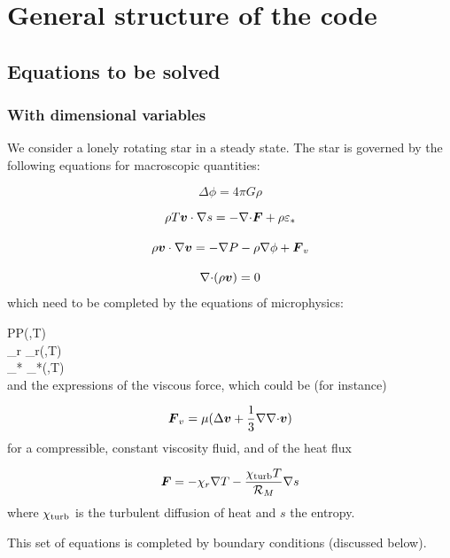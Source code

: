 \chapter{General structure of the code}


\section{Equations to be solved}

\subsection{With dimensional variables}

We consider a lonely rotating star in a steady state. The star is
governed by the following equations for macroscopic quantities:

\begin{equation} \Delta\phi = 4\pi G\rho\end{equation}

\begin{equation} \rho T \vv\cdot\nabla s = -\Div\vF + \rho\eps_*\end{equation}

\begin{equation} \rho \vv\cdot\na\vv = -\na P -\rho\na\phi+\vF_v\end{equation}

\begin{equation} \Div(\rho\vv) =0\end{equation}
which need to be completed by the equations of microphysics:

\greq
P\equiv P(\rho,T)\\
\khi_r \equiv \khi_r(\rho,T)\\
\eps_* \equiv \eps_*(\rho,T)\\
\egreq
and the expressions of the viscous force, which could be (for instance)

\begin{equation} \vF_v = \mu(\Delta\vv + \frac{1}{3}\na\Div\vv)\end{equation}
for a compressible, constant viscosity fluid, and of the heat flux

\begin{equation} \vF = -\khi_r\na T -\frac{\khi_{\rm turb}T}{{\cal R}_M}\na s\end{equation}
where $\chi_{\rm turb}$ is the turbulent diffusion of heat and $s$ the
entropy.

This set of equations is completed by boundary conditions (discussed
below).

